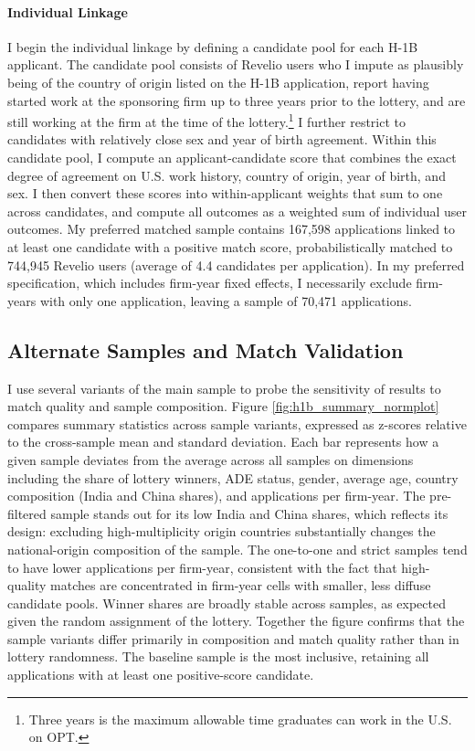 \paragraph{Individual Linkage}
I begin the individual linkage by defining a candidate pool for each H-1B applicant. The candidate pool consists of Revelio users who I impute as plausibly being of the country of origin listed on the H-1B application, report having started work at the sponsoring firm up to three years prior to the lottery, and are still working at the firm at the time of the lottery.\footnote{Three years is the maximum allowable time graduates can work in the U.S. on OPT.} I further restrict to candidates with relatively close sex and year of birth agreement. Within this candidate pool, I compute an applicant-candidate score that combines the exact degree of agreement on U.S. work history, country of origin, year of birth, and sex. I then convert these scores into within-applicant weights that sum to one across candidates, and compute all outcomes as a weighted sum of individual user outcomes. My preferred matched sample contains 167,598 applications linked to at least one candidate with a positive match score, probabilistically matched to 744,945 Revelio users (average of 4.4 candidates per application). In my preferred specification, which includes firm-year fixed effects, I necessarily exclude firm-years with only one application, leaving a sample of 70,471 applications.

\subsection{Alternate Samples and Match Validation}
I use several variants of the main sample to probe the sensitivity of results to match quality and sample composition. Figure \ref{fig:h1b_summary_normplot} compares summary statistics across sample variants, expressed as z-scores relative to the cross-sample mean and standard deviation. Each bar represents how a given sample deviates from the average across all samples on dimensions including the share of lottery winners, ADE status, gender, average age, country composition (India and China shares), and applications per firm-year. The pre-filtered sample stands out for its low India and China shares, which reflects its design: excluding high-multiplicity origin countries substantially changes the national-origin composition of the sample. The one-to-one and strict samples tend to have lower applications per firm-year, consistent with the fact that high-quality matches are concentrated in firm-year cells with smaller, less diffuse candidate pools. Winner shares are broadly stable across samples, as expected given the random assignment of the lottery. Together the figure confirms that the sample variants differ primarily in composition and match quality rather than in lottery randomness.
The baseline sample is the most inclusive, retaining all applications with at least one positive-score candidate.


